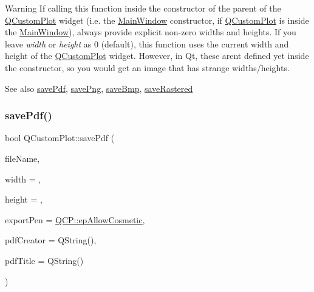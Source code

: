 \begin{DoxyWarning}{Warning}
If calling this function inside the constructor of the parent of the \hyperlink{class_q_custom_plot}{Q\+Custom\+Plot} widget (i.\+e. the \hyperlink{class_main_window}{Main\+Window} constructor, if \hyperlink{class_q_custom_plot}{Q\+Custom\+Plot} is inside the \hyperlink{class_main_window}{Main\+Window}), always provide explicit non-\/zero widths and heights. If you leave {\itshape width} or {\itshape height} as 0 (default), this function uses the current width and height of the \hyperlink{class_q_custom_plot}{Q\+Custom\+Plot} widget. However, in Qt, these aren\textquotesingle{}t defined yet inside the constructor, so you would get an image that has strange widths/heights.
\end{DoxyWarning}
\begin{DoxySeeAlso}{See also}
\hyperlink{class_q_custom_plot_ad5acd34f6b39c3516887d7e54fec2412}{save\+Pdf}, \hyperlink{class_q_custom_plot_ac92cc9256d12f354b40a4be4600b5fb9}{save\+Png}, \hyperlink{class_q_custom_plot_ae3a86ed0795670e50afa21759d4fa13d}{save\+Bmp}, \hyperlink{class_q_custom_plot_ad7723ce2edfa270632ef42b03a444352}{save\+Rastered} 
\end{DoxySeeAlso}
\mbox{\label{class_q_custom_plot_ad5acd34f6b39c3516887d7e54fec2412}} 
\subsubsection{\texorpdfstring{save\+Pdf()}{savePdf()}}
{\footnotesize\ttfamily bool Q\+Custom\+Plot\+::save\+Pdf (\begin{DoxyParamCaption}\item[{const Q\+String \&}]{file\+Name,  }\item[{int}]{width = {},  }\item[{int}]{height = {},  }\item[{\hyperlink{namespace_q_c_p_a17844f19e1019693a953e1eb93536d2f}{Q\+C\+P\+::\+Export\+Pen}}]{export\+Pen = {\ttfamily \hyperlink{namespace_q_c_p_a17844f19e1019693a953e1eb93536d2fa50d3657dba3fb90560b93a823cb0a6e8}{Q\+C\+P\+::ep\+Allow\+Cosmetic}},  }\item[{const Q\+String \&}]{pdf\+Creator = {\ttfamily QString()},  }\item[{const Q\+String \&}]{pdf\+Title = {\ttfamily QString()} }\end{DoxyParamCaption})}

